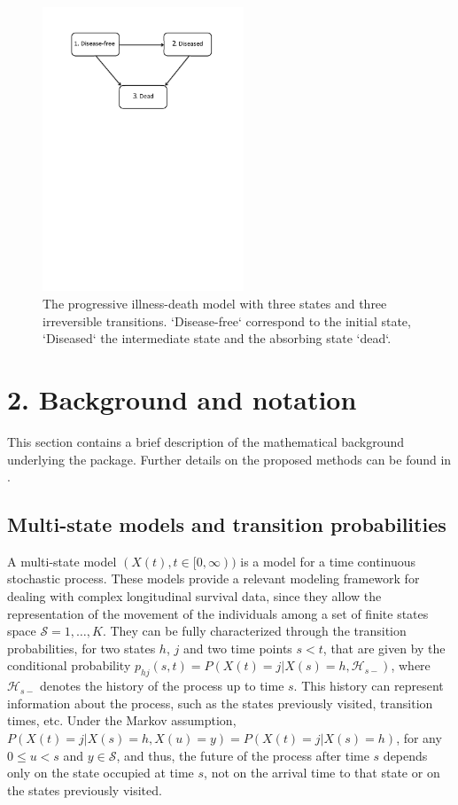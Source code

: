 \begin{figure} [t] %
\centering
\includegraphics[width=6cm]{illness-death.pdf}
\caption{\label{IDM} The progressive illness-death model with three states and three irreversible transitions. `Disease-free` correspond to the initial state, `Diseased` the intermediate state and the absorbing state `dead`.}
\end{figure}


\section{2. Background and notation} \label{sec:methodology}

This section contains a brief description of the mathematical background underlying the  package. Further details on the proposed methods can be found in \cite{soutinho_machado2020}.

\subsection{Multi-state models and transition probabilities} \label{multi}
A multi-state model $(X(t),t\in [0,\infty))$ is a model for a time continuous stochastic process. These models provide a relevant modeling framework for dealing with complex longitudinal survival data, since they allow the representation of the movement of the individuals among a set of finite states space $\mathcal{S}={1,\ldots ,K}$. They can be fully characterized through the transition probabilities, for two states $h$, $j$ and two time points $s < t$, that are given by the conditional probability $p_{hj}(s,t)=P(X(t)=j|X(s)=h, \mathcal{H}_{s-})$, where $\mathcal{H}_{s-}$ denotes the history of the process up to time $s$. This history can represent information about the process, such as the states previously visited, transition times, etc. Under the Markov assumption, $P(X(t)=j|X(s)=h, X(u)=y)=P(X(t)=j|X(s)=h)$, for any $0\leq u<s$ and $y \in \mathcal{S}$, and thus, the future of the process after time $s$ depends only on the state occupied at time $s$, not on the arrival time to that state or on the states previously visited.  

